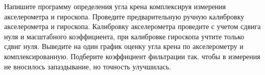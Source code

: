 
Напишите программу определения угла крена комплексируя измерения акселерометра и гироскопа. Проведите предварительную ручную калибровку акселерометра и гироскопа. Калибровку акселерометра проведите с учетом сдвига нуля и масштабного коэффициента, при калибровке гироскопа учтите только сдвиг нуля. Выведите на один график оценку угла крена по акселерометру и комплексированную. Подберите коэффициент фильтрации так. чтобы в измерения не вносилось запаздывание, но точность улучшилась.

